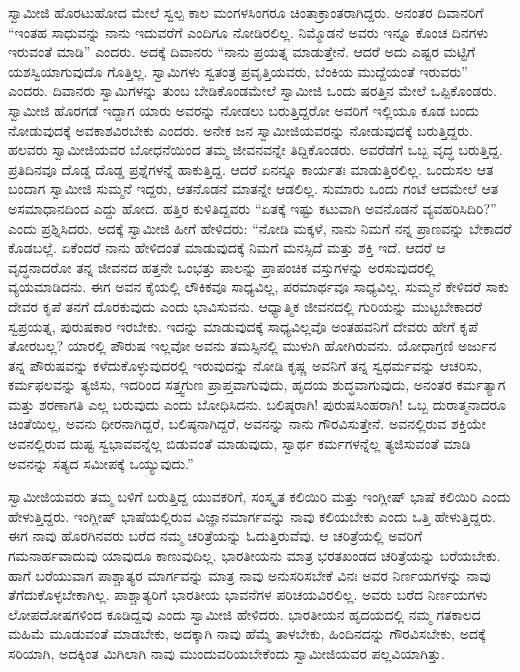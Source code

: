  ಸ್ವಾಮೀಜಿ ಹೊರಟುಹೋದ ಮೇಲೆ ಸ್ವಲ್ಪ ಕಾಲ ಮಂಗಳಸಿಂಗರೂ ಚಿಂತಾಕ್ರಾಂತರಾಗಿದ್ದರು. ಅನಂತರ ದಿವಾನರಿಗೆ “ಇಂತಹ ಸಾಧುವನ್ನು ನಾನು ಇದುವರೆಗೆ ಎಂದಿಗೂ ನೋಡಿರಲಿಲ್ಲ. ನಿಮ್ಮೊಡನೆ ಅವರು ಇನ್ನೂ ಕೊಂಚ ದಿನಗಳು ಇರುವಂತೆ ಮಾಡಿ” ಎಂದರು. ಅದಕ್ಕೆ ದಿವಾನರು “ನಾನು ಪ್ರಯತ್ನ ಮಾಡುತ್ತೇನೆ. ಆದರೆ ಅದು ಎಷ್ಟರ ಮಟ್ಟಿಗೆ ಯಶಸ್ವಿಯಾಗುವುದೊ ಗೊತ್ತಿಲ್ಲ. ಸ್ವಾಮಿಗಳು ಸ್ವತಂತ್ರ ಪ್ರವೃತ್ತಿಯವರು, ಬೆಂಕಿಯ ಮುದ್ದೆಯಂತೆ ಇರುವರು” ಎಂದರು. ದಿವಾನರು ಸ್ವಾಮಿಗಳನ್ನು ತುಂಬ ಬೇಡಿಕೊಂಡಮೇಲೆ ಸ್ವಾಮೀಜಿ ಒಂದು ಷರತ್ತಿನ ಮೇಲೆ ಒಪ್ಪಿಕೊಂಡರು. ಸ್ವಾಮೀಜಿ ಹೊರಗಡೆ ಇದ್ದಾಗ ಯಾರು ಅವರನ್ನು ನೋಡಲು ಬರುತ್ತಿದ್ದರೋ ಅವರಿಗೆ ಇಲ್ಲಿಯೂ ಕೂಡ ಬಂದು ನೋಡುವುದಕ್ಕೆ ಅವಕಾಶವಿರಬೇಕು ಎಂದರು. ಅನೇಕ ಜನ ಸ್ವಾಮೀಜಿಯವರನ್ನು ನೋಡುವುದಕ್ಕೆ ಬರುತ್ತಿದ್ದರು. ಹಲವರು ಸ್ವಾಮೀಜಿಯವರ ಬೋಧನೆಯಿಂದ ತಮ್ಮ ಜೀವನವನ್ನೇ ತಿದ್ದಿಕೊಂಡರು. ಅವರೆಡೆಗೆ ಒಬ್ಬ ವೃದ್ಧ ಬರುತ್ತಿದ್ದ. ಪ್ರತಿದಿನವೂ ದೊಡ್ಡ ದೊಡ್ಡ ಪ್ರಶ್ನೆಗಳನ್ನೆ ಹಾಕುತ್ತಿದ್ದ. ಆದರೆ ಏನನ್ನೂ ಕಾರ್ಯತಃ ಮಾಡುತ್ತಿರಲಿಲ್ಲ. ಒಂದುಸಲ ಆತ ಬಂದಾಗ ಸ್ವಾಮೀಜಿ ಸುಮ್ಮನೆ ಇದ್ದರು, ಆತನೊಡನೆ ಮಾತನ್ನೇ ಆಡಲಿಲ್ಲ. ಸುಮಾರು ಒಂದು ಗಂಟೆ ಆದಮೇಲೆ ಆತ ಅಸಮಾಧಾನದಿಂದ ಎದ್ದು ಹೋದ. ಹತ್ತಿರ ಕುಳಿತಿದ್ದವರು “ಏತಕ್ಕೆ ಇಷ್ಟು ಕಟುವಾಗಿ ಅವನೊಡನೆ ವ್ಯವಹರಿಸಿದಿರಿ?” ಎಂದು ಪ್ರಶ್ನಿಸಿದರು. ಅದಕ್ಕೆ ಸ್ವಾಮೀಜಿ ಹೀಗೆ ಹೇಳಿದರು: “ನೋಡಿ ಮಕ್ಕಳೆ, ನಾನು ನಿಮಗೆ ನನ್ನ ಪ್ರಾಣವನ್ನು ಬೇಕಾದರೆ ಕೊಡಬಲ್ಲೆ. ಏಕೆಂದರೆ ನಾನು ಹೇಳಿದಂತೆ ಮಾಡುವುದಕ್ಕೆ ನಿಮಗೆ ಮನಸ್ಸಿದೆ ಮತ್ತು ಶಕ್ತಿ ಇದೆ. ಆದರೆ ಆ ವೃದ್ಧನಾದರೋ ತನ್ನ ಜೀವನದ ಹತ್ತನೇ ಒಂಭತ್ತು ಪಾಲನ್ನು ಪ್ರಾಪಂಚಿಕ ವಸ್ತುಗಳನ್ನು ಅರಸುವುದರಲ್ಲಿ ವ್ಯಯಮಾಡಿದನು. ಈಗ ಅವನ ಕೈಯಲ್ಲಿ ಲೌಕಿಕವೂ ಸಾಧ್ಯವಿಲ್ಲ, ಪರಮಾರ್ಥವೂ ಸಾಧ್ಯವಿಲ್ಲ. ಸುಮ್ಮನೆ ಕೇಳಿದರೆ ಸಾಕು ದೇವರ ಕೃಪೆ ತನಗೆ ದೊರಕುವುದು ಎಂದು ಭಾವಿಸುವನು. ಆಧ್ಯಾತ್ಮಿಕ ಜೀವನದಲ್ಲಿ ಗುರಿಯನ್ನು ಮುಟ್ಟಬೇಕಾದರೆ ಸ್ವಪ್ರಯತ್ನ, ಪುರುಷಕಾರ ಇರಬೇಕು. ಇದನ್ನು ಮಾಡುವುದಕ್ಕೆ ಸಾಧ್ಯವಿಲ್ಲವೊ ಅಂತಹವನಿಗೆ ದೇವರು ಹೇಗೆ ಕೃಪೆ ತೋರಬಲ್ಲ? ಯಾರಲ್ಲಿ ಪೌರುಷ ಇಲ್ಲವೋ ಅವನು ತಮಸ್ಸಿನಲ್ಲಿ ಮುಳುಗಿ ಹೋಗಿರುವನು. ಯೋಧಾಗ್ರಣಿ ಅರ್ಜುನ ತನ್ನ ಪೌರುಷವನ್ನು ಕಳೆದುಕೊಳ್ಳುವುದರಲ್ಲಿ ಇರುವುದನ್ನು ನೋಡಿ ಕೃಷ್ಣ ಅವನಿಗೆ ತನ್ನ ಸ್ವಧರ್ಮವನ್ನು ಆಚರಿಸು, ಕರ್ಮಫಲವನ್ನು ತ್ಯಜಿಸು, ಇದರಿಂದ ಸತ್ತ್ವಗುಣ ಪ್ರಾಪ್ತವಾಗುವುದು, ಹೃದಯ ಶುದ್ಧವಾಗುವುದು, ಅನಂತರ ಕರ್ಮತ್ಯಾಗ ಮತ್ತು ಶರಣಾಗತಿ ಎಲ್ಲ ಬರುವುದು ಎಂದು ಬೋಧಿಸಿದನು. ಬಲಿಷ್ಠರಾಗಿ! ಪುರುಷಸಿಂಹರಾಗಿ! ಒಬ್ಬ ದುರಾತ್ಮನಾದರೂ ಚಿಂತೆಯಿಲ್ಲ, ಅವನು ಧೀರನಾಗಿದ್ದರೆ, ಬಲಿಷ್ಠನಾಗಿದ್ದರೆ, ಅವನನ್ನು ನಾನು ಗೌರವಿಸುತ್ತೇನೆ. ಅವನಲ್ಲಿರುವ ಶಕ್ತಿಯೇ ಅವನಲ್ಲಿರುವ ದುಷ್ಟ ಸ್ವಭಾವವನ್ನೆಲ್ಲ ಬಿಡುವಂತೆ ಮಾಡುವುದು, ಸ್ವಾರ್ಥ ಕರ್ಮಗಳನ್ನೆಲ್ಲ ತ್ಯಜಿಸುವಂತೆ ಮಾಡಿ ಅವನನ್ನು ಸತ್ಯದ ಸಮೀಪಕ್ಕೆ ಒಯ್ಯುವುದು.” 

 ಸ್ವಾಮೀಜಿಯವರು ತಮ್ಮ ಬಳಿಗೆ ಬರುತ್ತಿದ್ದ ಯುವಕರಿಗೆ, ಸಂಸ್ಕೃತ ಕಲಿಯಿರಿ ಮತ್ತು ಇಂಗ್ಲೀಷ್ ಭಾಷೆ ಕಲಿಯಿರಿ ಎಂದು ಹೇಳುತ್ತಿದ್ದರು. ಇಂಗ್ಲೀಷ್ ಭಾಷೆಯಲ್ಲಿರುವ ವಿಜ್ಞಾನಮಾರ್ಗವನ್ನು ನಾವು ಕಲಿಯಬೇಕು ಎಂದು ಒತ್ತಿ ಹೇಳುತ್ತಿದ್ದರು. ಈಗ ನಾವು ಹೊರಗಿನವರು ಬರೆದ ನಮ್ಮ ಚರಿತ್ರೆಯನ್ನು ಓದುತ್ತಿರುವೆವು. ಆ ಚರಿತ್ರೆಯಲ್ಲಿ ಅವರಿಗೆ ಗಮನಾರ್ಹವಾದುವು ಯಾವುದೂ ಕಾಣುವುದಿಲ್ಲ. ಭಾರತೀಯನು ಮಾತ್ರ ಭರತಖಂಡದ ಚರಿತ್ರೆಯನ್ನು ಬರೆಯಬೇಕು. ಹಾಗೆ ಬರೆಯುವಾಗ ಪಾಶ್ಚಾತ್ಯರ ಮಾರ್ಗವನ್ನು ಮಾತ್ರ ನಾವು ಅನುಸರಿಸಬೇಕೆ ವಿನಃ ಅವರ ನಿರ್ಣಯಗಳನ್ನು ನಾವು ತೆಗೆದುಕೊಳ್ಳಬೇಕಾಗಿಲ್ಲ. ಪಾಶ್ಚಾತ್ಯರಿಗೆ ಭಾರತೀಯ ಭಾವನೆಗಳ ಪರಿಚಯವಿರಲಿಲ್ಲ. ಅವರು ಬರೆದ ನಿರ್ಣಯಗಳು ಲೋಪದೋಷಗಳಿಂದ ಕೂಡಿದ್ದವು ಎಂದು ಸ್ವಾಮೀಜಿ ಹೇಳಿದರು. ಭಾರತೀಯನ ಹೃದಯದಲ್ಲಿ ನಮ್ಮ ಗತಕಾಲದ ಮಹಿಮೆ ಮೂಡುವಂತೆ ಮಾಡಬೇಕು, ಅದಕ್ಕಾಗಿ ನಾವು ಹೆಮ್ಮೆ ತಾಳಬೇಕು, ಹಿಂದಿನದನ್ನು ಗೌರವಿಸಬೇಕು, ಅದಕ್ಕೆ ಸರಿಯಾಗಿ, ಅದಕ್ಕಿಂತ ಮಿಗಿಲಾಗಿ ನಾವು ಮುಂದುವರಿಯಬೇಕೆಂದು ಸ್ವಾಮೀಜಿಯವರ ಪಲ್ಲವಿಯಾಗಿತ್ತು. 

